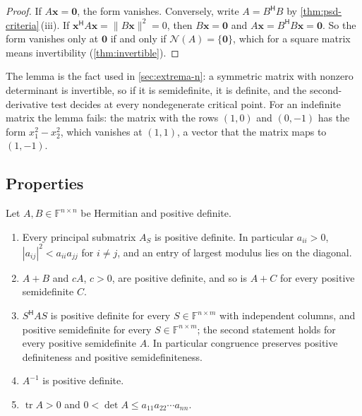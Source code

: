 \begin{proof}
If $A\mathbf x=\mathbf 0$, the form vanishes. Conversely, write $A=B^{\mathsf H}B$ by \cref{thm:psd-criteria}\,(iii). If $\mathbf x^{\mathsf H}A\mathbf x=\|B\mathbf x\|^2=0$, then $B\mathbf x=\mathbf 0$ and $A\mathbf x=B^{\mathsf H}B\mathbf x=\mathbf 0$. So the form vanishes only at $\mathbf 0$ if and only if $\mathcal N(A)=\{\mathbf 0\}$, which for a square matrix means invertibility (\cref{thm:invertible}).
\end{proof}

The lemma is the fact used in \cref{sec:extrema-n}: a symmetric matrix with nonzero determinant is invertible, so if it is semidefinite, it is definite, and the second-derivative test decides at every nondegenerate critical point. For an indefinite matrix the lemma fails: the matrix with the rows $(1,0)$ and $(0,-1)$ has the form $x_1^2-x_2^2$, which vanishes at $(1,1)$, a vector that the matrix maps to $(1,-1)$.

\subsection{Properties}

\begin{proposition}
\label{prop:pd-properties}
Let $A,B\in\mathbb F^{n\times n}$ be Hermitian and positive definite.
\begin{enumerate}
\item Every principal submatrix $A_S$ is positive definite. In particular $a_{ii}>0$, $|a_{ij}|^2<a_{ii}a_{jj}$ for $i\ne j$, and an entry of largest modulus lies on the diagonal.
\item $A+B$ and $cA$, $c>0$, are positive definite, and so is $A+C$ for every positive semidefinite $C$.
\item $S^{\mathsf H}AS$ is positive definite for every $S\in\mathbb F^{n\times m}$ with independent columns, and positive semidefinite for every $S\in\mathbb F^{n\times m}$; the second statement holds for every positive semidefinite $A$. In particular congruence preserves positive definiteness and positive semidefiniteness.
\item $A^{-1}$ is positive definite.
\item $\operatorname{tr}A>0$ and $0<\det A\le a_{11}a_{22}\cdots a_{nn}$.
\end{enumerate}
\end{proposition}

